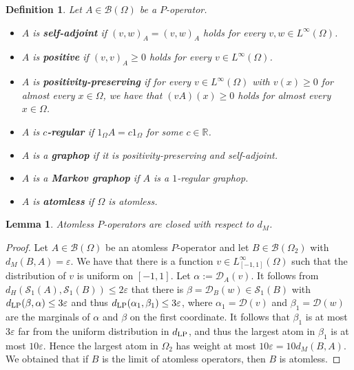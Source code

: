 \documentclass[a4wider]{amsart}
\newtheorem{definition}[theorem]{Definition}
\newtheorem{lemma}[theorem]{Lemma}
\theoremstyle{definitionbreak}\newtheorem{D}[theorem]{Definition}
\theoremstyle{definitionbreak}\newtheorem*{D*}{Definition}
\begin{document}
\begin{definition}\label{defprops} Let $A\in\mathcal{B}(\Omega)$ be a $P$-operator. 
\begin{itemize}
\item $A$ is {\bf self-adjoint} if $(v,w)_A=(v,w)_A$ holds for every $v,w\in L^\infty(\Omega)$.
\item $A$ is {\bf positive} if $(v,v)_A\geq 0$ holds for every $v\in L^\infty(\Omega)$.
\item $A$ is {\bf positivity-preserving} if for every $v\in L^\infty(\Omega)$ with $v(x)\geq 0$ for almost every $x\in\Omega$, we have that $(vA)(x)\geq 0$ holds for almost every $x\in\Omega$.
\item $A$ is {\bf $c$-regular} if $1_\Omega A=c1_\Omega$ for some $c\in\mathbb{R}$.
\item $A$ is a {\bf graphop} if it is positivity-preserving and self-adjoint.
\item $A$ is a {\bf Markov graphop} if $A$ is a $1$-regular graphop.
\item $A$ is {\bf atomless} if $\Omega$ is atomless.
\end{itemize}
\end{definition}

\begin{lemma}\label{atclosed} Atomless $P$-operators are closed with respect to $d_M$.
\end{lemma}

\begin{proof} Let $A\in\mathcal{B}(\Omega)$ be an atomless $P$-operator and let $B\in\mathcal{B}(\Omega_2)$ with $d_M(B,A)=\varepsilon$. We have that there is a function $v\in L^{\infty}_{[-1,1]}(\Omega)$ such that the distribution of $v$ is uniform on $[-1,1]$. Let $\alpha:=\mathcal{D}_A(v)$.  It follows from $d_H(\mathcal{S}_1(A),\mathcal{S}_1(B))\leq 2\varepsilon$ that there is $\beta=\mathcal{D}_B(w)\in\mathcal{S}_1(B)$ with $d_{\rm LP}(\beta,\alpha)\leq 3\varepsilon$ and thus $d_{\rm LP}(\alpha_1,\beta_1)\leq3\varepsilon$, where $\alpha_1=\mathcal{D}(v)$ and $\beta_1=\mathcal{D}(w)$ are the marginals of $\alpha$ and $\beta$ on the first coordinate. It follows that $\beta_1$ is at most $3\varepsilon$ far from the uniform distribution in $d_{\rm LP}$, and thus the largest atom in $\beta_1$ is at most $10\varepsilon$. Hence the largest atom in $\Omega_2$ has weight at most $10\varepsilon=10d_M(B,A)$. We obtained that if $B$ is the limit of atomless operators, then $B$ is atomless. 
\end{proof}
\end{document}
